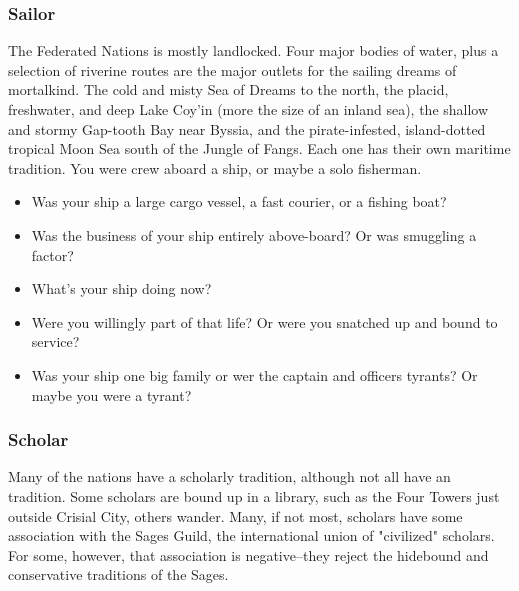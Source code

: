 \subsubsection{Sailor}

The Federated Nations is mostly landlocked. Four major bodies of water, plus a selection of riverine routes are the major outlets for the sailing dreams of mortalkind. The cold and misty Sea of Dreams to the north, the placid, freshwater, and deep Lake Coy'in (more the size of an inland sea), the shallow and stormy Gap-tooth Bay near Byssia, and the pirate-infested, island-dotted tropical Moon Sea south of the Jungle of Fangs. Each one has their own maritime tradition. You were crew aboard a ship, or maybe a solo fisherman.

\begin{itemize}
	\item Was your ship a large cargo vessel, a fast courier, or a fishing boat?
	\item Was the business of your ship entirely above-board? Or was smuggling a factor?
	\item What's your ship doing now?
	\item Were you willingly part of that life? Or were you snatched up and bound to service?
	\item Was your ship one big family or wer the captain and officers tyrants? Or maybe you were a tyrant?
\end{itemize}

\subsubsection{Scholar}

Many of the nations have a scholarly tradition, although not all have an  tradition. Some scholars are bound up in a library, such as the Four Towers just outside Crisial City, others wander. Many, if not most, scholars have some association with the Sages Guild, the international union of "civilized" scholars. For some, however, that association is negative--they reject the hidebound and conservative traditions of the Sages.

